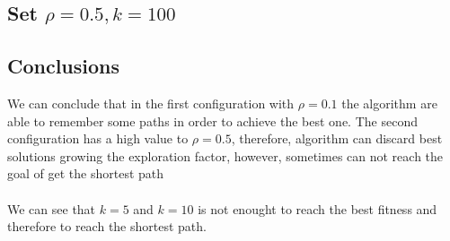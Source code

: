 \newpage
\subsection{Set $\rho = 0.5, k=100$}


\begin{figure}[ht]
\centering
{}
\label{fig:figure10}
\end{figure}


\newpage
\subsection{Conclusions}
We can conclude that in the first configuration with $\rho = 0.1$ the algorithm are able to remember some paths in order to achieve the best one. The second configuration has a high value to $\rho = 0.5$, therefore, algorithm can discard best solutions growing the exploration factor, however, sometimes can not reach the goal of get the shortest path
\\
\\
We can see that $k=5$ and $k=10$ is not enought to reach the best fitness and therefore to reach the shortest path.